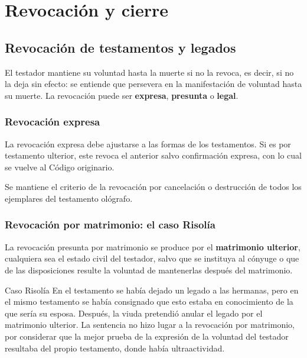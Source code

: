 \documentclass[12pt,oneside]{book}
\begin{document}
\chapter[Revocación y cierre]{Revocación y cierre}

\section{Revocación de testamentos y legados}

El testador mantiene su voluntad hasta la muerte si no la revoca, es decir, si no la deja sin efecto: se entiende que persevera en la manifestación de voluntad hasta su muerte. La revocación puede ser \textbf{expresa}, \textbf{presunta} o \textbf{legal}.

\subsection{Revocación expresa}

La revocación expresa debe ajustarse a las formas de los testamentos. Si es por testamento ulterior, este revoca el anterior salvo confirmación expresa, con lo cual se vuelve al Código originario.

Se mantiene el criterio de la revocación por cancelación o destrucción de todos los ejemplares del testamento ológrafo.

\subsection{Revocación por matrimonio: el caso Risolía}

La revocación presunta por matrimonio se produce por el \textbf{matrimonio ulterior}, cualquiera sea el estado civil del testador, salvo que se instituya al cónyuge o que de las disposiciones resulte la voluntad de mantenerlas después del matrimonio.

\begin{example}{Caso Risolía}
En el testamento se había dejado un legado a las hermanas, pero en el mismo testamento se había consignado que esto estaba en conocimiento de la que sería su esposa. Después, la viuda pretendió anular el legado por el matrimonio ulterior. La sentencia no hizo lugar a la revocación por matrimonio, por considerar que la mejor prueba de la expresión de la voluntad del testador resultaba del propio testamento, donde había ultraactividad.
\end{example}
\end{document}
